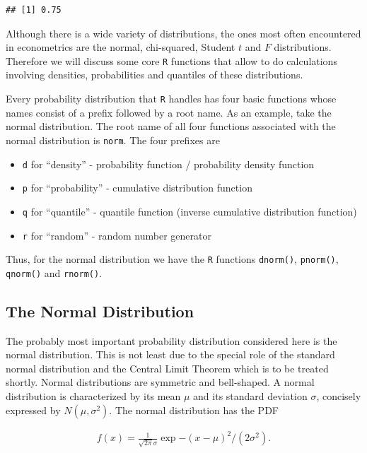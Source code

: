 \documentclass[]{book}
\providecommand{\tightlist}{%
  \setlength{\itemsep}{0pt}\setlength{\parskip}{0pt}}
\theoremstyle{definition}
\theoremstyle{definition}
\theoremstyle{definition}
\theoremstyle{remark}
\begin{document}
\begin{verbatim}
## [1] 0.75
\end{verbatim}

Although there is a wide variety of distributions, the ones most often
encountered in econometrics are the normal, chi-squared, Student \(t\)
and \(F\) distributions. Therefore we will discuss some core \texttt{R}
functions that allow to do calculations involving densities,
probabilities and quantiles of these distributions.

Every probability distribution that \texttt{R} handles has four basic
functions whose names consist of a prefix followed by a root name. As an
example, take the normal distribution. The root name of all four
functions associated with the normal distribution is \texttt{norm}. The
four prefixes are

\begin{itemize}
\tightlist
\item
  \texttt{d} for ``density'' - probability function / probability
  density function
\item
  \texttt{p} for ``probability'' - cumulative distribution function
\item
  \texttt{q} for ``quantile'' - quantile function (inverse cumulative
  distribution function)
\item
  \texttt{r} for ``random'' - random number generator
\end{itemize}

Thus, for the normal distribution we have the \texttt{R} functions
\texttt{dnorm()}, \texttt{pnorm()}, \texttt{qnorm()} and
\texttt{rnorm()}.

\subsection*{The Normal Distribution}\label{the-normal-distribution}

The probably most important probability distribution considered here is
the normal distribution. This is not least due to the special role of
the standard normal distribution and the Central Limit Theorem which is
to be treated shortly. Normal distributions are symmetric and
bell-shaped. A normal distribution is characterized by its mean \(\mu\)
and its standard deviation \(\sigma\), concisely expressed by
\(N(\mu,\sigma^2)\). The normal distribution has the PDF

\begin{align}
f(x) = \frac{1}{\sqrt{2 \pi} \sigma} \exp{-(x - μ)^2/(2 σ^2)}.
\end{align}
\end{document}
